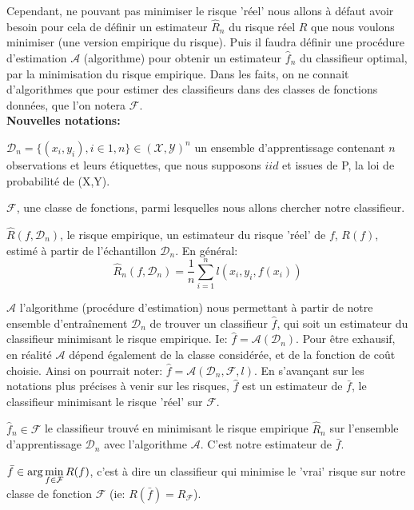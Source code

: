 \documentclass[a4paper]{article}
\theoremstyle{plain}
\begin{document}
Cependant, ne pouvant pas minimiser le risque 'réel' nous allons à défaut avoir besoin pour cela de définir un estimateur $\hat R_n$ du risque réel $R$ que nous voulons minimiser (une version empirique du risque). Puis il faudra définir une procédure d'estimation $\mathcal{A}$ (algorithme) pour obtenir un estimateur $\hat f_n$ du classifieur optimal, par la minimisation du risque empirique. Dans les faits, on ne connait d'algorithmes que pour estimer des classifieurs dans des classes de fonctions données, que l'on notera $\mathcal{F}$.
\\

\textbf{Nouvelles notations:}

\begin{outline}

\1 $ \mathcal{D}_n = \{(x_i, y_i), i \in 1,n\} \in (\mathcal{X},\mathcal{Y})^n$ un ensemble d’apprentissage contenant $n$ observations et leurs étiquettes, que nous supposons $iid$ et issues de P, la loi de probabilité de (X,Y).

\1 $\mathcal{F}$, une classe de fonctions, parmi lesquelles nous allons chercher notre classifieur.

\1 $\hat R(f, \mathcal{D}_n)$, le risque empirique, un estimateur du risque 'réel' de $f$, $R(f)$, estimé à partir de l'échantillon $\mathcal{D}_n$. En général: $$\hat R_n(f, \mathcal{D}_n) = \frac{1}{n}\sum_{i=1}^{n}\mathit{l}(x_i,y_i,f(x_i))$$

\1 $\mathcal{A}$ l'algorithme (procédure d'estimation) nous permettant à partir de notre ensemble d'entraînement $\mathcal{D}_n$ de trouver un classifieur $\hat f$, qui soit un estimateur du classifieur minimisant le risque empirique. Ie: $\hat f = \mathcal{A}(\mathcal{D}_n) $. Pour être exhausif, en réalité $\mathcal{A}$ dépend également de la classe considérée, et de la fonction de coût choisie. Ainsi on pourrait noter: $\hat f = \mathcal{A}(\mathcal{D}_n,\mathcal{F},l)$. En s'avançant sur les notations plus précises à venir sur les risques, $\hat f$ est un estimateur de $\bar f$, le classifieur  minimisant le risque 'réel' sur $\mathcal{F}$.

\1 $\hat f_n \in \mathcal{F}$ le classifieur trouvé en minimisant le risque empirique $\hat R_n$ sur l'ensemble d'apprentissage $\mathcal{D}_n$ avec l'algorithme $\mathcal{A}$. C'est notre estimateur de $\bar f$.

\1 $\bar f \in {\rm arg} \displaystyle\min_{f \in \mathcal{F}} R(f) $, c'est à dire un classifieur qui minimise le 'vrai' risque sur notre classe de fonction $\mathcal{F}$ (ie: $R(\bar f) = R_{\mathcal{F}}$).

\end{outline}
\end{document}
